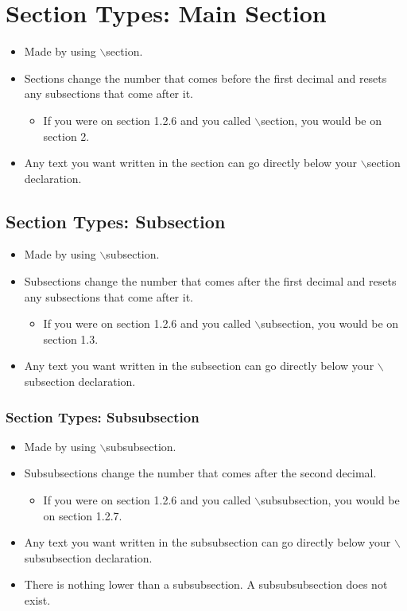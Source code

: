 \section{Section Types: Main Section}
	\begin{itemize}
		\item Made by using $\backslash$section.
		\item Sections change the number that comes before the first decimal and resets any subsections that come after it.
		\begin{itemize}
			\item If you were on section 1.2.6 and you called $\backslash$section, you would be on section 2.
		\end{itemize}
		\item Any text you want written in the section can go directly below your $\backslash$section declaration.
	\end{itemize}

	\subsection{Section Types: Subsection}
		\begin{itemize}
			\item Made by using $\backslash$subsection.
			\item Subsections change the number that comes after the first decimal and resets any subsections that come after it.
			\begin{itemize}
				\item If you were on section 1.2.6 and you called $\backslash$subsection, you would be on section 1.3.
			\end{itemize}
			\item Any text you want written in the subsection can go directly below your $\backslash$subsection declaration.
		\end{itemize}

		\subsubsection{Section Types: Subsubsection}
			\begin{itemize}
				\item Made by using $\backslash$subsubsection.
				\item Subsubsections change the number that comes after the second decimal.
				\begin{itemize}
					\item If you were on section 1.2.6 and you called $\backslash$subsubsection, you would be on section 1.2.7.
				\end{itemize}
				\item Any text you want written in the subsubsection can go directly below your $\backslash$subsubsection declaration.
				\item There is nothing lower than a subsubsection. A subsubsubsection does not exist.
			\end{itemize}

